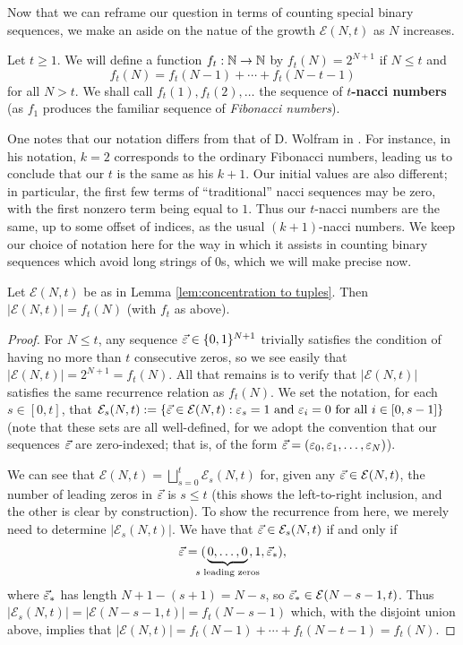 Now that we can reframe our question in terms of counting special binary sequences, we make an aside on the natue of the growth $\mathcal{E}(N,t)$ as $N$ increases.

\begin{defn} \label{def:nacci numbers}
Let $t\ge 1$.
We will define a function $f_t: \mathbb{N} \to \mathbb{N}$ by $f_t(N) = 2^{N+1}$ if $N\le t$ and 
\[ f_t(N) = f_t(N-1) + \cdots + f_t(N-t-1) \]
for all $N>t$.
We shall call $f_t(1), f_t(2),\dots$ the sequence of \textbf{$t$-nacci numbers} (as $f_1$ produces the familiar sequence of \textit{Fibonacci numbers}).
\end{defn}
One notes that our notation differs from that of D. Wolfram in \cite{wolfram98}.
For instance, in his notation, $k=2$ corresponds to the ordinary Fibonacci numbers, leading us to conclude that our $t$ is the same as his $k+1$.
Our initial values are also different; in particular, the first few terms of ``traditional'' nacci sequences may be zero, with the first nonzero term being equal to $1$. 
Thus our $t$-nacci numbers are the same, up to some offset of indices, as the usual $(k+1)$-nacci numbers.
We keep our choice of notation here for the way in which it assists in counting binary sequences which avoid long strings of $0$s, which we will make precise now.

\begin{prop} \label{lem:nacci numbers count tuples}
Let $\mathcal{E}(N,t)$ be as in Lemma \ref{lem:concentration to tuples}. Then $|\mathcal{E}(N,t)| = f_t(N)$ (with $f_t$ as above).
\end{prop}
\begin{proof}
For $N\le t$, any sequence $\vec{\varepsilon}\in \{0,1\}^{N+1}$ trivially satisfies the condition of having no more than $t$ consecutive zeros, so we see easily that $|\mathcal{E}(N,t)| = 2^{N+1} = f_t(N)$.  
All that remains is to verify that $|\mathcal{E}(N,t)|$ satisfies the same recurrence relation as $f_t(N)$.
We set the notation, for each $s \in [0,t]$, that $\mathcal{E}_s(N,t) := \{\vec{\varepsilon}\in \mathcal{E}(N,t): \varepsilon_s = 1 \textrm{ and } \varepsilon_i = 0 \textrm{ for all $i\in [0,s-1]$} \}$ (note that these sets are all well-defined, for we adopt the convention that our sequences $\vec{\varepsilon}$ are zero-indexed; that is, of the form $\vec{\varepsilon} = (\varepsilon_0,\varepsilon_1,\dots, \varepsilon_N)$).

We can see that $\mathcal{E}(N,t) = \bigsqcup_{s=0}^t \mathcal{E}_s(N,t)$ for, given any $\vec{\varepsilon}\in \mathcal{E}(N,t)$, the number of leading zeros in $\vec{\varepsilon}$ is $s\le t$ (this shows the left-to-right inclusion, and the other is clear by construction).
To show the recurrence from here, we merely need to determine $|\mathcal{E}_s(N,t)|$.
We have that $\vec{\varepsilon}\in \mathcal{E}_s(N,t)$ if and only if 
\[\vec{\e} = (\!\!\!\!\!\underbrace{0,\dots,0}_{s \textrm{ leading zeros}}\!\!\!\!\!, 1, \vec{\e}_*),\]
 where $\vec{\varepsilon}_*$ has length $N+1 - (s+1) = N-s$, so $\vec{\varepsilon}_*\in \mathcal{E}(N-s-1,t)$.
 Thus $|\mathcal{E}_s(N,t)| = |\mathcal{E}(N-s-1,t)|=f_t(N-s-1)$ which, with the disjoint union above, implies that $|\mathcal{E}(N,t)| = f_t(N-1) + \cdots + f_t(N-t-1) = f_t(N)$.
\end{proof}


